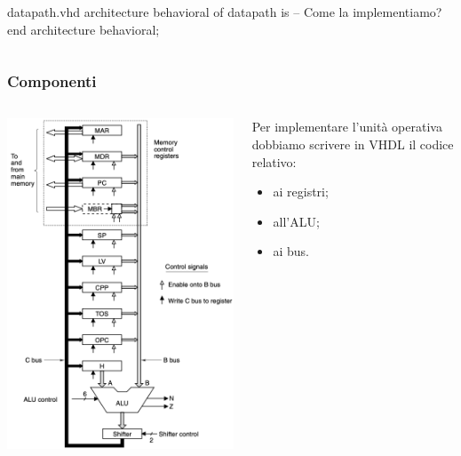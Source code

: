 \documentclass{beamer}
\begin{document}
\begin{frame}[fragile]
\begin{columns}
\begin{column}{0.6\textwidth}
\begin{myvhdl}{datapath.vhd}
architecture behavioral of datapath is
  -- Come la implementiamo?
end architecture behavioral;
\end{myvhdl}
    \end{column}
  \end{columns}
\end{frame}

\begin{frame}[fragile]
  \frametitle{Componenti}
  \begin{columns}
    \begin{column}{0.4\textwidth}
      \begin{center}
        \includegraphics[width=\textwidth]{datapath.png}
      \end{center}
    \end{column}
    \begin{column}{0.6\textwidth}
      Per implementare l'unità operativa dobbiamo scrivere in VHDL il codice
      relativo:
      \begin{itemize}
        \item ai registri;
        \item all'ALU;
        \item ai bus.
      \end{itemize}
    \end{column}
  \end{columns}
\end{frame}
\end{document}
